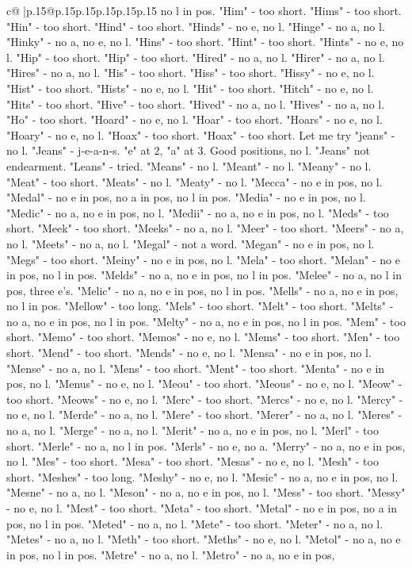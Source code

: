 \documentclass{article}
\begin{document}
{\begin{supertabular}{c@{$\;$}|p{.15\linewidth}@{}p{.15\linewidth}p{.15\linewidth}p{.15\linewidth}p{.15\linewidth}p{.15\linewidth}}
{{{no l in pos. "Him" {-} too short. "Hims" {-} too short. "Hin" {-} too short. "Hind" {-} too short. "Hinds" {-} no e, no l. "Hinge" {-} no a, no l. "Hinky" {-} no a, no e, no l. "Hins" {-} too short. "Hint" {-} too short. "Hints" {-} no e, no l. "Hip" {-} too short. "Hip" {-} too short. "Hired" {-} no a, no l. "Hirer" {-} no a, no l. "Hires" {-} no a, no l. "His" {-} too short. "Hiss" {-} too short. "Hissy" {-} no e, no l. "Hist" {-} too short. "Hists" {-} no e, no l. "Hit" {-} too short. "Hitch" {-} no e, no l. "Hits" {-} too short. "Hive" {-} too short. "Hived" {-} no a, no l. "Hives" {-} no a, no l. "Ho" {-} too short. "Hoard" {-} no e, no l. "Hoar" {-} too short. "Hoars" {-} no e, no l. "Hoary" {-} no e, no l. "Hoax" {-} too short. "Hoax" {-} too short. Let me try "jeans" {-} no l. "Jeans" {-} j{-}e{-}a{-}n{-}s. "e" at 2, "a" at 3. Good positions, no l. "Jeans" not endearment. "Leans" {-} tried. "Means" {-} no l. "Meant" {-} no l. "Meany" {-} no l. "Meat" {-} too short. "Meats" {-} no l. "Meaty" {-} no l. "Mecca" {-} no e in pos, no l. "Medal" {-} no e in pos, no a in pos, no l in pos. "Media" {-} no e in pos, no l. "Medic" {-} no a, no e in pos, no l. "Medii" {-} no a, no e in pos, no l. "Meds" {-} too short. "Meek" {-} too short. "Meeks" {-} no a, no l. "Meer" {-} too short. "Meers" {-} no a, no l. "Meets" {-} no a, no l. "Megal" {-} not a word. "Megan" {-} no e in pos, no l. "Megs" {-} too short. "Meiny" {-} no e in pos, no l. "Mela" {-} too short. "Melan" {-} no e in pos, no l in pos. "Melds" {-} no a, no e in pos, no l in pos. "Melee" {-} no a, no l in pos, three e's. "Melic" {-} no a, no e in pos, no l in pos. "Mells" {-} no a, no e in pos, no l in pos. "Mellow" {-} too long. "Mels" {-} too short. "Melt" {-} too short. "Melts" {-} no a, no e in pos, no l in pos. "Melty" {-} no a, no e in pos, no l in pos. "Mem" {-} too short. "Memo" {-} too short. "Memos" {-} no e, no l. "Mems" {-} too short. "Men" {-} too short. "Mend" {-} too short. "Mends" {-} no e, no l. "Mensa" {-} no e in pos, no l. "Mense" {-} no a, no l. "Mens" {-} too short. "Ment" {-} too short. "Menta" {-} no e in pos, no l. "Menus" {-} no e, no l. "Meou" {-} too short. "Meous" {-} no e, no l. "Meow" {-} too short. "Meows" {-} no e, no l. "Merc" {-} too short. "Mercs" {-} no e, no l. "Mercy" {-} no e, no l. "Merde" {-} no a, no l. "Mere" {-} too short. "Merer" {-} no a, no l. "Meres" {-} no a, no l. "Merge" {-} no a, no l. "Merit" {-} no a, no e in pos, no l. "Merl" {-} too short. "Merle" {-} no a, no l in pos. "Merls" {-} no e, no a. "Merry" {-} no a, no e in pos, no l. "Mes" {-} too short. "Mesa" {-} too short. "Mesas" {-} no e, no l. "Mesh" {-} too short. "Meshes" {-} too long. "Meshy" {-} no e, no l. "Mesic" {-} no a, no e in pos, no l. "Mesne" {-} no a, no l. "Meson" {-} no a, no e in pos, no l. "Mess" {-} too short. "Messy" {-} no e, no l. "Mest" {-} too short. "Meta" {-} too short. "Metal" {-} no e in pos, no a in pos, no l in pos. "Meted" {-} no a, no l. "Mete" {-} too short. "Meter" {-} no a, no l. "Metes" {-} no a, no l. "Meth" {-} too short. "Meths" {-} no e, no l. "Metol" {-} no a, no e in pos, no l in pos. "Metre" {-} no a, no l. "Metro" {-} no a, no e in pos, }}}
\end{supertabular}}
\end{document}

